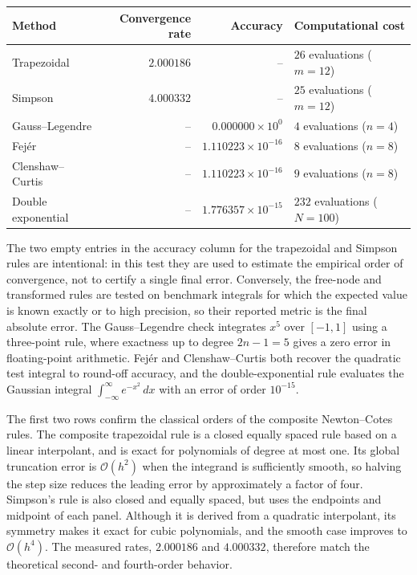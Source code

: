 \begin{center}
	\centering
	\label{tab:quadrature-test-metrics}
	\renewcommand{\arraystretch}{1.2}
	\begin{tabular}{lrrl}
		\toprule
		Method             & Convergence rate & Accuracy                   & Computational cost          \\
		\midrule
		Trapezoidal        & $2.000186$       & --                         & $26$ evaluations ($m=12$)   \\
		Simpson            & $4.000332$       & --                         & $25$ evaluations ($m=12$)   \\
		Gauss--Legendre    & --               & $0.000000 \times 10^0$     & $4$ evaluations ($n=4$)     \\
		Fejér              & --               & $1.110223 \times 10^{-16}$ & $8$ evaluations ($n=8$)     \\
		Clenshaw--Curtis   & --               & $1.110223 \times 10^{-16}$ & $9$ evaluations ($n=8$)     \\
		Double exponential & --               & $1.776357 \times 10^{-15}$ & $232$ evaluations ($N=100$) \\
		\bottomrule
	\end{tabular}
\end{center}

The two empty entries in the accuracy column for the trapezoidal and Simpson
rules are intentional: in this test they are used to estimate the empirical
order of convergence, not to certify a single final error. Conversely, the
free-node and transformed rules are tested on benchmark integrals for which the
expected value is known exactly or to high precision, so their reported metric is
the final absolute error. The Gauss--Legendre check integrates $x^5$ over
$[-1,1]$ using a three-point rule, where exactness up to degree $2n-1=5$ gives a
zero error in floating-point arithmetic. Fejér and Clenshaw--Curtis both recover
the quadratic test integral to round-off accuracy, and the double-exponential
rule evaluates the Gaussian integral $\int_{-\infty}^{\infty}e^{-x^2}\,dx$ with
an error of order $10^{-15}$.

The first two rows confirm the classical orders of the composite Newton--Cotes
rules. The composite trapezoidal rule is a closed equally spaced rule based on a
linear interpolant, and is exact for polynomials of degree at most one. Its
global truncation error is $\mathcal{O}(h^2)$ when the integrand is sufficiently
smooth, so halving the step size reduces the leading error by approximately a
factor of four. Simpson's rule is also closed and equally spaced, but uses the
endpoints and midpoint of each panel. Although it is derived from a quadratic
interpolant, its symmetry makes it exact for cubic polynomials, and the smooth
case improves to $\mathcal{O}(h^4)$. The measured rates, $2.000186$ and
$4.000332$, therefore match the theoretical second- and fourth-order behavior.

